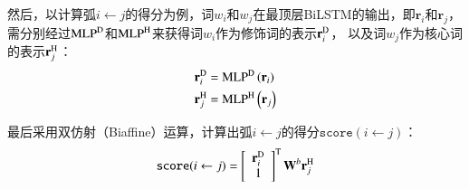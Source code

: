 然后，以计算弧$i \leftarrow j$的得分为例，词$w_i$和$w_j$在最顶层BiLSTM的输出，即$\mathbf{r}_i$和$\mathbf{r}_j$，
需分别经过$\textup{MLP}^\textup{D}$和$\textup{MLP}^\textup{H}$来获得词$w_i$作为修饰词的表示$\mathbf{r}_i^\textup{D}$，
以及词$w_j$作为核心词的表示$\mathbf{r}_j^\textup{H}$：
\begin{equation}\label{eq:mlp}
    \begin{split}
        \mathbf{r}_{i}^{\textup{D}} &= \textup{MLP}^\textup{D} \left(\mathbf{r}_i \right) \\
        \mathbf{r}_{j}^{\textup{H}} &= \textup{MLP}^\textup{H} \left(\mathbf{r}_j \right) \\
    \end{split}
\end{equation}



最后采用双仿射（Biaffine）运算，计算出弧$i \leftarrow j$的得分$\texttt{score}(i \leftarrow j)$：
\begin{equation} \label{eq:biaffine}
    \texttt{score}(i \leftarrow j) =  \left[
        \begin{array}{c}
            \mathbf{r}_{i}^{\textup D} \\
            1
        \end{array}
        \right]^\mathrm{T}
    \mathbf{W}^b  \mathbf{r}_{j}^{\textup H}
\end{equation}

